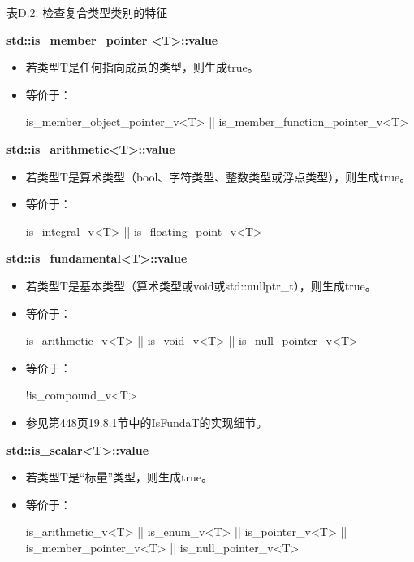 \begin{center}
表D.2. 检查复合类型类别的特征
\end{center}

\textbf{std::is\_member\_pointer <T>::value}

\begin{itemize}
\item 
若类型T是任何指向成员的类型，则生成true。

\item 
等价于： 
\begin{cpp}
is_member_object_pointer_v<T> || is_member_function_pointer_v<T>
\end{cpp}
\end{itemize}

\textbf{std::is\_arithmetic<T>::value}

\begin{itemize}
\item 
若类型T是算术类型（bool、字符类型、整数类型或浮点类型），则生成true。

\item 
等价于： 
\begin{cpp}
is_integral_v<T> || is_floating_point_v<T>
\end{cpp}
\end{itemize}

\textbf{std::is\_fundamental<T>::value}

\begin{itemize}
\item 
若类型T是基本类型（算术类型或void或std::nullptr\_t），则生成true。

\item 
等价于： 
\begin{cpp}
is_arithmetic_v<T> || is_void_v<T> || is_null_pointer_v<T>
\end{cpp}

\item 
等价于： 
\begin{cpp}
!is_compound_v<T>
\end{cpp}

\item 
参见第448页19.8.1节中的IsFundaT的实现细节。
\end{itemize}

\textbf{std::is\_scalar<T>::value}

\begin{itemize}
\item 
若类型T是“标量”类型，则生成true。

\item 
等价于：  
\begin{cpp}
is_arithmetic_v<T> || is_enum_v<T> || is_pointer_v<T>
|| is_member_pointer_v<T> || is_null_pointer_v<T>
\end{cpp}
\end{itemize}

